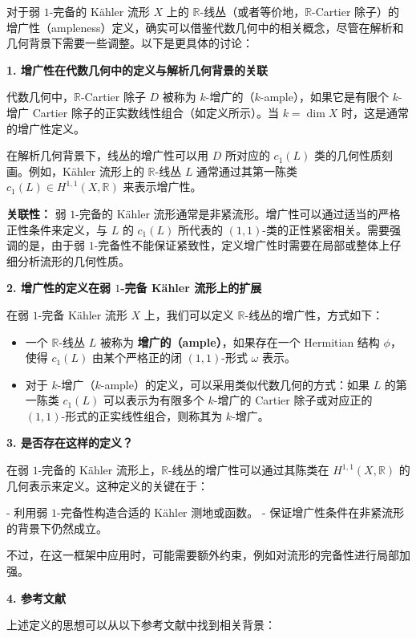 \documentclass[lang=cn,zihao=-4,a4paper,fontset=none]{beautybook}
\begin{document}
\begin{solution}
     
对于弱 $1$-完备的 Kähler 流形 $X$ 上的 $\mathbb{R}$-线丛（或者等价地，$\mathbb{R}$-Cartier 除子）的增广性（ampleness）定义，确实可以借鉴代数几何中的相关概念，尽管在解析和几何背景下需要一些调整。以下是更具体的讨论：


 \textbf{1. 增广性在代数几何中的定义与解析几何背景的关联}

代数几何中，$\mathbb{R}$-Cartier 除子 $D$ 被称为 $k$-增广的（$k$-ample），如果它是有限个 $k$-增广 Cartier 除子的正实数线性组合（如定义所示）。当 $k = \dim X$ 时，这是通常的增广性定义。

在解析几何背景下，线丛的增广性可以用 $D$ 所对应的 $c_1(L)$ 类的几何性质刻画。例如，Kähler 流形上的 $\mathbb{R}$-线丛 $L$ 通常通过其第一陈类 $c_1(L) \in H^{1,1}(X, \mathbb{R})$ 来表示增广性。

 \textbf{关联性：  }
弱 $1$-完备的 Kähler 流形通常是非紧流形。增广性可以通过适当的严格正性条件来定义，与 $L$ 的 $c_1(L)$ 所代表的 $ (1,1) $-类的正性紧密相关。需要强调的是，由于弱 $1$-完备性不能保证紧致性，定义增广性时需要在局部或整体上仔细分析流形的几何性质。


 \textbf{2. 增广性的定义在弱 $1$-完备 Kähler 流形上的扩展}

在弱 $1$-完备 Kähler 流形 $X$ 上，我们可以定义 $\mathbb{R}$-线丛的增广性，方式如下：
\begin{itemize}
    \item  一个 $\mathbb{R}$-线丛 $L$ 被称为  \textbf{增广的（ample）}，如果存在一个 Hermitian 结构 $\phi$，使得 $c_1(L)$ 由某个严格正的闭 $(1,1)$-形式 $ \omega $ 表示。
    \item 对于 $k$-增广（$k$-ample）的定义，可以采用类似代数几何的方式：如果 $L$ 的第一陈类 $c_1(L)$ 可以表示为有限多个 $k$-增广的 Cartier 除子或对应正的 $(1,1)$-形式的正实线性组合，则称其为 $k$-增广。
\end{itemize}

 \textbf{3. 是否存在这样的定义？}

在弱 $1$-完备的 Kähler 流形上，$\mathbb{R}$-线丛的增广性可以通过其陈类在 $H^{1,1}(X, \mathbb{R})$ 的几何表示来定义。这种定义的关键在于：

- 利用弱 $1$-完备性构造合适的 Kähler 测地或函数。
- 保证增广性条件在非紧流形的背景下仍然成立。

不过，在这一框架中应用时，可能需要额外约束，例如对流形的完备性进行局部加强。


 \textbf{4. 参考文献}

上述定义的思想可以从以下参考文献中找到相关背景：

\end{solution}
\end{document}
